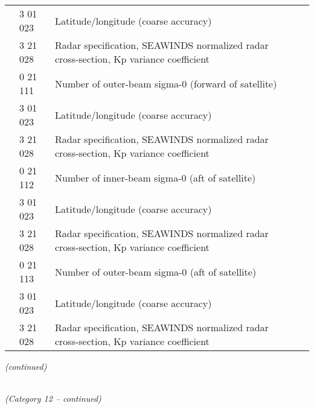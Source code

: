 \begin{longtable}[]{@{}llll@{}}
& 3 01 023 & Latitude/longitude (coarse accuracy) &\tabularnewline
& 3 21 028 & Radar specification, SEAWINDS normalized radar cross-section, Kp variance coefficient &\tabularnewline
& 0 21 111 & Number of outer-beam sigma-0 (forward of satellite) &\tabularnewline
& 3 01 023 & Latitude/longitude (coarse accuracy) &\tabularnewline
& 3 21 028 & Radar specification, SEAWINDS normalized radar cross-section, Kp variance coefficient &\tabularnewline
& 0 21 112 & Number of inner-beam sigma-0 (aft of satellite) &\tabularnewline
& 3 01 023 & Latitude/longitude (coarse accuracy) &\tabularnewline
& 3 21 028 & Radar specification, SEAWINDS normalized radar cross-section, Kp variance coefficient &\tabularnewline
& 0 21 113 & Number of outer-beam sigma-0 (aft of satellite) &\tabularnewline
& 3 01 023 & Latitude/longitude (coarse accuracy) &\tabularnewline
& 3 21 028 & Radar specification, SEAWINDS normalized radar cross-section, Kp variance coefficient &\tabularnewline
\bottomrule
\end{longtable}

\emph{(continued)}

\emph{\\
(Category 12 -- continued)}

